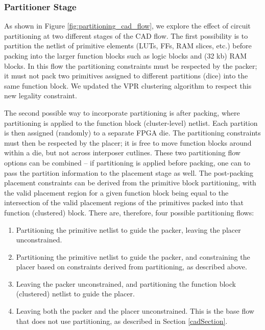 \subsubsection{Partitioner Stage}
As shown in Figure \ref{fig:partitioning_cad_flow}, we explore the effect of circuit partitioning at two different stages of the CAD flow. The first possibility is to partition the netlist of primitive elements (LUTs, FFs, RAM slices, etc.) before packing into the larger function blocks such as logic blocks and (32 kb) RAM blocks. In this flow the partitioning constraints must be respected by the packer; it must not pack two primitives assigned to different partitions (dice) into the same function block. We updated the VPR clustering algorithm to respect this new legality constraint.

The second possible way to incorporate partitioning is after packing, where partitioning is applied to the function block (cluster-level) netlist. Each partition is then assigned (randomly) to a separate FPGA die. The partitioning constraints must then be respected by the placer; it is free to move function blocks around within a die, but not across interposer cutlines. These two partitioning flow options can be combined -- if partitioning is applied before packing, one can to pass the partition information to the placement stage as well. The post-packing placement constraints can be derived from the primitive block partitioning, with the valid placement region for a given function block being equal to the intersection of the valid placement regions of the primitives packed into that function (clustered) block. There are, therefore, four possible partitioning flows:

\begin{enumerate}
  \item Partitioning the primitive netlist to guide the packer, leaving the placer unconstrained.
  \item Partitioning the primitive netlist to guide the packer, and constraining the placer based on constraints derived from partitioning, as described above.
  \item Leaving the packer unconstrained, and partitioning the function block (clustered) netlist to guide the placer.
  \item Leaving both the packer and the placer unconstrained. This is the base flow that does not use partitioning, as described in Section \ref{cadSection}.
\end{enumerate}

